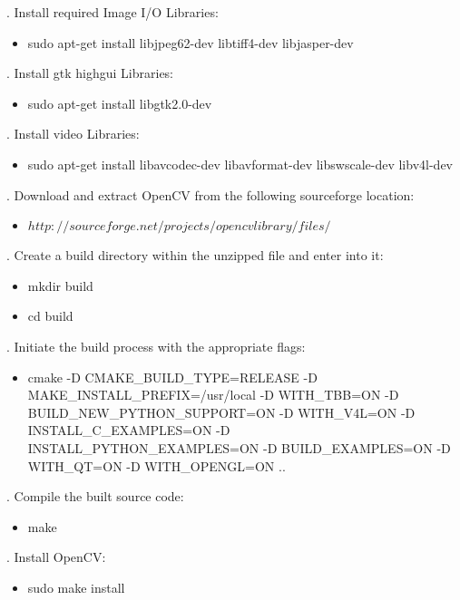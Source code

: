 . Install required Image I/O Libraries:
\begin{itemize}
	\item[]sudo apt-get install libjpeg62-dev libtiff4-dev libjasper-dev
\end{itemize}

. Install gtk highgui Libraries:
\begin{itemize}
	\item[]sudo apt-get install  libgtk2.0-dev
\end{itemize}

. Install video Libraries:
\begin{itemize}
	\item[]sudo apt-get install libavcodec-dev libavformat-dev libswscale-dev libv4l-dev
\end{itemize}

. Download and extract OpenCV from the following sourceforge location:
\begin{itemize}
	\item[]\href{http://sourceforge.net/projects/opencvlibrary/files/}{$http://sourceforge.net/projects/opencvlibrary/files/$}
\end{itemize}

. Create a build directory within the unzipped file and enter into it:
\begin{itemize}
	\item[]mkdir \textunderscore build
	\item[]cd \textunderscore build
\end{itemize}

. Initiate the build process with the appropriate flags:
\begin{itemize}
	\item[]cmake -D CMAKE\_BUILD\_TYPE=RELEASE -D MAKE\_INSTALL\_PREFIX=/usr/local -D  WITH\_TBB=ON -D BUILD\_NEW\_PYTHON\_SUPPORT=ON -D WITH\_V4L=ON -D INSTALL\_C\_EXAMPLES=ON -D INSTALL\_PYTHON\_EXAMPLES=ON -D BUILD\_EXAMPLES=ON -D WITH\_QT=ON -D WITH\_OPENGL=ON ..
\end{itemize}

.  Compile the built source code:
\begin{itemize}
	\item[]make
\end{itemize}

. Install OpenCV:
\begin{itemize}
	\item[]sudo make install
\end{itemize}


